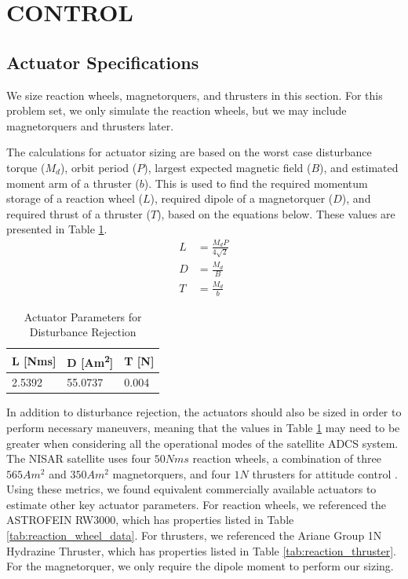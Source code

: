 \section{\Large CONTROL}
\subsection{Actuator Specifications}
We size reaction wheels, magnetorquers, and thrusters in this section. For this problem set, we only simulate the reaction wheels, but we may include magnetorquers and thrusters later.

The calculations for actuator sizing are based on the worst case disturbance torque ($M_d$), orbit period ($P$), largest expected magnetic field ($B$), and estimated moment arm of a thruster ($b$). This is used to find the required momentum storage of a reaction wheel ($L$), required dipole of a magnetorquer ($D$), and required thrust of a thruster ($T$), based on the equations below. These values are presented in Table \ref{tab:estimate_actuator_sizing}.
\begin{align*}
    L &= \frac{M_d P}{4 \sqrt{2}} \\
    D &= \frac{M_d}{B} \\
    T &= \frac{M_d}{b}
\end{align*}
\vspace{-2em}
\begin{table}[H]
\centering
\caption{Actuator Parameters for Disturbance Rejection}
\label{tab:estimate_actuator_sizing}
\begin{tabular}{|l|l|l|}
\hline
L [Nms] & D [A\/m\textsuperscript{2}] & T [N]    \\ \hline
2.5392    & 55.0737   & 0.004        \\ \hline
\end{tabular}
\end{table}

In addition to disturbance rejection, the actuators should also be sized in order to perform necessary maneuvers, meaning that the values in Table \ref{tab:estimate_actuator_sizing} may need to be greater when considering all the operational modes of the satellite ADCS system. The NISAR satellite uses four $50 N m s$ reaction wheels, a combination of three $565 A m^2$ and $350 A m^2$ magnetorquers, and four $1 N$ thrusters for attitude control \cite{NISARMission}. Using these metrics, we found equivalent commercially available actuators to estimate other key actuator parameters. For reaction wheels, we referenced the ASTROFEIN RW3000, which has properties listed in Table \ref{tab:reaction_wheel_data}. For thrusters, we referenced the Ariane Group 1N Hydrazine Thruster, which has properties listed in Table \ref{tab:reaction_thruster}. For the magnetorquer, we only require the dipole moment to perform our sizing.

